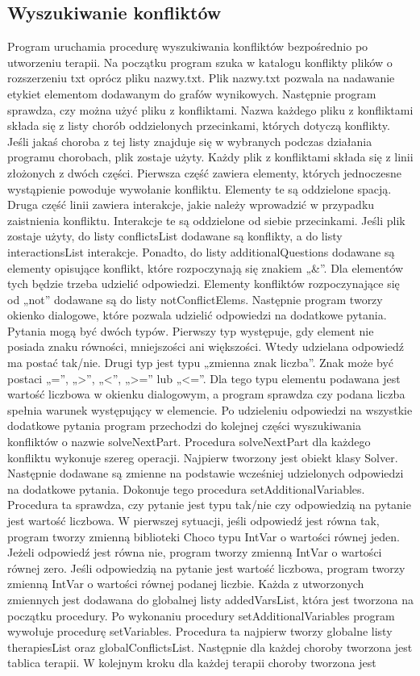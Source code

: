 \documentclass[oneside,a4paper]{book}
\begin{document}
\begin{spacing}{1.5}
\section{Wyszukiwanie konfliktów}

Program uruchamia procedurę wyszukiwania konfliktów bezpośrednio po utworzeniu terapii. Na początku program szuka w katalogu konflikty plików o rozszerzeniu txt oprócz pliku nazwy.txt. Plik nazwy.txt pozwala na nadawanie etykiet elementom dodawanym do grafów wynikowych. Następnie program sprawdza, czy można użyć pliku z konfliktami. Nazwa każdego pliku z konfliktami składa się z listy chorób oddzielonych przecinkami, których dotyczą konflikty. Jeśli jakaś choroba z tej listy znajduje się w wybranych podczas działania programu chorobach, plik zostaje użyty. Każdy plik z konfliktami składa się z linii złożonych z dwóch części. Pierwsza część zawiera elementy, których jednoczesne wystąpienie powoduje wywołanie konfliktu. Elementy te są oddzielone spacją. Druga część linii zawiera interakcje, jakie należy wprowadzić w przypadku zaistnienia konfliktu. Interakcje te są oddzielone od siebie przecinkami. Jeśli plik zostaje użyty, do listy conflictsList dodawane są konflikty, a do listy interactionsList interakcje. Ponadto, do listy additionalQuestions dodawane są elementy opisujące konflikt, które rozpoczynają się znakiem „\&”. Dla elementów tych będzie trzeba udzielić odpowiedzi. Elementy konfliktów rozpoczynające się od „not” dodawane są do listy notConflictElems. Następnie program tworzy okienko dialogowe, które pozwala udzielić odpowiedzi na dodatkowe pytania. Pytania mogą być dwóch typów. Pierwszy typ występuje, gdy element nie posiada znaku równości, mniejszości ani większości. Wtedy udzielana odpowiedź ma postać tak/nie. Drugi typ jest typu „zmienna znak liczba”. Znak może być postaci „=”, „>”, „<”, „>=” lub „<=”. Dla tego typu elementu podawana jest wartość liczbowa w okienku dialogowym, a program sprawdza czy podana liczba spełnia warunek występujący w elemencie. Po udzieleniu odpowiedzi na wszystkie dodatkowe pytania program przechodzi do kolejnej części wyszukiwania konfliktów o nazwie solveNextPart. Procedura solveNextPart  dla każdego konfliktu wykonuje szereg operacji. Najpierw tworzony jest obiekt klasy Solver. Następnie dodawane są zmienne na podstawie wcześniej udzielonych odpowiedzi na dodatkowe pytania. Dokonuje tego procedura setAdditionalVariables. Procedura ta sprawdza, czy pytanie jest typu tak/nie czy odpowiedzią na pytanie jest wartość liczbowa. W pierwszej sytuacji, jeśli odpowiedź jest równa tak, program tworzy zmienną biblioteki Choco typu IntVar o wartości równej jeden. Jeżeli odpowiedź jest równa nie, program tworzy zmienną IntVar o wartości równej zero. Jeśli odpowiedzią na pytanie jest wartość liczbowa, program tworzy zmienną IntVar o wartości równej podanej liczbie. Każda z utworzonych zmiennych jest dodawana do globalnej listy addedVarsList, która jest tworzona na początku procedury. Po wykonaniu procedury setAdditionalVariables program wywołuje procedurę setVariables. Procedura ta najpierw tworzy globalne listy therapiesList oraz globalConflictsList. Następnie dla każdej choroby tworzona jest tablica terapii. W kolejnym kroku dla każdej terapii choroby tworzona jest 
\end{spacing}
\end{document}
